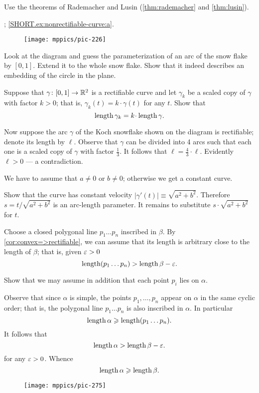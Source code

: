  Use the theorems of Rademacher and Lusin (\ref{thm:rademacher} and \ref{thm:lusin}).

\parbf{\ref{ex:nonrectifiable-curve}}; \ref{SHORT.ex:nonrectifiable-curve:a}.
\begin{figure}[h!]
\vskip-0mm
\centering
\texttt{[image: mppics/pic-226]}
\vskip0mm
\end{figure}
Look at the diagram and guess the parameterization of an arc of the snow flake by $[0,1]$.
Extend it to the whole snow flake.
Show that it indeed describes an embedding of the circle in the plane.

Suppose that $\gamma\colon[0,1]\to\mathbb{R}^2$ is a rectifiable curve and let $\gamma_k$ be a scaled copy of $\gamma$ with factor $k>0$;
that is, $\gamma_k(t)=k\cdot\gamma(t)$ for any $t$.
Show that 
\[\length\gamma_k=k\cdot\length \gamma.\]

Now suppose the arc $\gamma$ of the Koch snowflake shown on the diagram is rectifiable; denote its length by $\ell$.
Observe that $\gamma$ can be divided into 4 arcs such that each one is a scaled copy of $\gamma$ with factor $\tfrac13$.
It follows that $\ell=\tfrac43\cdot\ell$.
Evidently $\ell>0$ --- a contradiction.

We have to assume that $a\ne 0$ or $b\ne0$;
otherwise we get a constant curve.

Show that the curve has constant velocity $|\gamma'(t)|\equiv \sqrt{a^2+b^2}$.
Therefore $s=t/\sqrt{a^2+b^2}$ is an arc-length parameter.
It remains to substitute $s\cdot \sqrt{a^2+b^2}$ for $t$.


Choose a closed polygonal line $p_1\dots p_n$ inscribed in $\beta$.
By \ref{cor:convex=>rectifiable}, we can assume that its length is arbitrary close to the length of $\beta$;
that is, given $\varepsilon>0$ 
\[\mathop{\rm length}\nolimits (p_1\dots p_n)>\mathop{\rm length}\nolimits\beta-\varepsilon.\]

Show that we may assume in addition that each point $p_i$ lies on $\alpha$.

Observe that since $\alpha$ is simple, the points $p_1,\dots,p_n$ appear on $\alpha$ in the same cyclic order;
that is, the polygonal line $p_1\dots p_n$ is also inscribed in $\alpha$.
In particular 
\[\mathop{\rm length}\nolimits\alpha\geqslant \mathop{\rm length}\nolimits (p_1\dots p_n).\]
It follows that 
\[\mathop{\rm length}\nolimits\alpha>\mathop{\rm length}\nolimits\beta-\varepsilon.\]
for any $\varepsilon>0$.
Whence 
\[\mathop{\rm length}\nolimits\alpha\geqslant\mathop{\rm length}\nolimits\beta.\]

\begin{wrapfigure}{r}{25 mm}
\vskip-0mm
\centering
\texttt{[image: mppics/pic-275]}
\vskip0mm
\end{wrapfigure}

